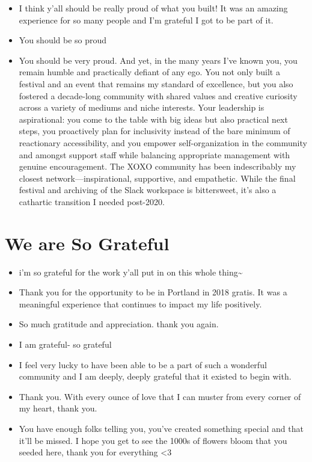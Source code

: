 \documentclass[
]{book}
\providecommand{\tightlist}{%
  \setlength{\itemsep}{0pt}\setlength{\parskip}{0pt}}
\begin{document}
\begin{itemize}
\tightlist
\item
  I think y'all should be really proud of what you built! It was an amazing experience for so many people and I'm grateful I got to be part of it.
\item
  You should be so proud
\item
  You should be very proud. And yet, in the many years I've known you, you remain humble and practically defiant of any ego. You not only built a festival and an event that remains my standard of excellence, but you also fostered a decade-long community with shared values and creative curiosity across a variety of mediums and niche interests. Your leadership is aspirational: you come to the table with big ideas but also practical next steps, you proactively plan for inclusivity instead of the bare minimum of reactionary accessibility, and you empower self-organization in the community and amongst support staff while balancing appropriate management with genuine encouragement. The XOXO community has been indescribably my closest network---inspirational, supportive, and empathetic. While the final festival and archiving of the Slack workspace is bittersweet, it's also a cathartic transition I needed post-2020.
\end{itemize}

\section{We are So Grateful}\label{we-are-so-grateful}

\begin{itemize}
\tightlist
\item
  i'm so grateful for the work y'all put in on this whole thing\textasciitilde{}
\item
  Thank you for the opportunity to be in Portland in 2018 gratis. It was a meaningful experience that continues to impact my life positively.
\item
  So much gratitude and appreciation. thank you again.
\item
  I am grateful- so grateful
\item
  I feel very lucky to have been able to be a part of such a wonderful community and I am deeply, deeply grateful that it existed to begin with.
\item
  Thank you. With every ounce of love that I can muster from every corner of my heart, thank you.
\item
  You have enough folks telling you, you've created something special and that it'll be missed. I hope you get to see the 1000s of flowers bloom that you seeded here, thank you for everything \textless3
\end{itemize}
\end{document}
